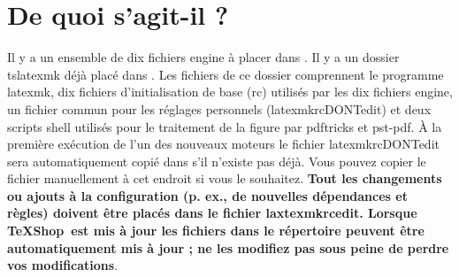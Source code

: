 \documentclass[11pt,french]{article}
\newcommand{\TS}{\textsf{\TeX Shop}}
\newcommand{\cmd}[1]{\textsf{#1}}
\begin{document}
%

\section{De quoi s'agit-il ?}

Il y a un ensemble de dix fichiers \cmd{engine} à placer dans . Il y a un dossier \cmd{tslatexmk} déjà placé dans . Les fichiers de ce dossier comprennent le programme \cmd{latexmk}, dix fichiers d'initialisation de base (\cmd{rc}) utilisés par les dix fichiers \cmd{engine}, un fichier commun pour les réglages personnels (\cmd{latexmkrcDONTedit}) et deux scripts shell utilisés pour le traitement de la figure par \cmd{pdftricks} et \cmd{pst-pdf}. À la première exécution de l'un des nouveaux moteurs le fichier \cmd{latexmkrcDONTedit} sera automatiquement copié dans  s'il  n'existe pas déjà. Vous pouvez copier le fichier manuellement à cet endroit si vous le souhaitez. \textbf{Tout les changements ou ajouts à la configuration (p. ex., de nouvelles dépendances et règles) doivent être placés dans le fichier \cmd{laxtexmkrcedit}. Lorsque \TS\ est mis à jour les fichiers dans le répertoire  peuvent être automatiquement mis à jour ; ne les modifiez pas sous peine de perdre vos modifications}.
\end{document}
